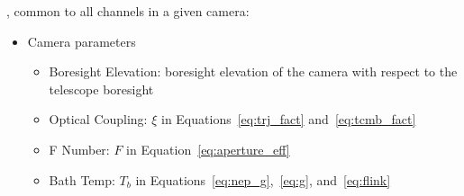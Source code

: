 \noindent
{}, common to all channels in a given camera:
\begin{itemize}
    \item Camera parameters
        \begin{itemize}
        \item Boresight Elevation: boresight elevation of the camera with respect to the telescope boresight
        \item Optical Coupling: $\xi$ in Equations~\ref{eq:trj_fact} and~\ref{eq:tcmb_fact}
        \item F Number: $F$ in Equation~\ref{eq:aperture_eff}
        \item Bath Temp: $T_{b}$ in Equations~\ref{eq:nep_g},~\ref{eq:g}, and~\ref{eq:flink}
        \end{itemize}
\end{itemize}

